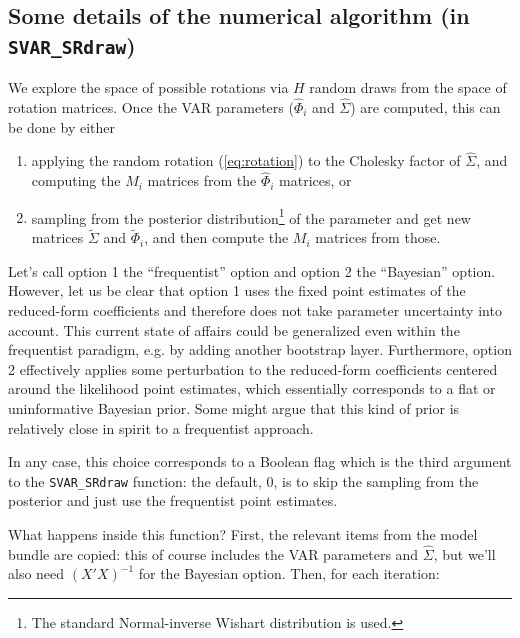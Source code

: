 \documentclass[a4paper,10pt]{article}
\begin{document}
\subsection{Some details of the numerical algorithm (in \texttt{SVAR\_SRdraw})}

We explore the space of possible
rotations via $H$ random draws from the space of rotation matrices.
Once the VAR parameters ($\hat{\Phi}_i$ and $\hat{\Sigma}$)
are computed, this can be done by either
\begin{enumerate}
\item applying the random rotation (\ref{eq:rotation}) to the Cholesky
  factor of $\hat{\Sigma}$, and computing the $M_i$ matrices from the
  $\hat{\Phi}_i$ matrices, or  
\item sampling from the posterior distribution\footnote{The standard
    Normal-inverse Wishart distribution is used.} of the parameter and
  get new matrices $\tilde{\Sigma}$ and $\tilde{\Phi}_i$, and then
  compute the $M_i$ matrices from those.
\end{enumerate}
Let's call option 1 the ``frequentist'' option and option 2 the
``Bayesian'' option. However, let us be clear that option 1 
uses the fixed point estimates of the reduced-form coefficients and 
therefore does not take parameter uncertainty into account. This current
state of affairs could be generalized even within the frequentist paradigm, 
e.g. by adding another bootstrap layer. Furthermore, option 2 effectively applies
some perturbation to the reduced-form coefficients centered around the 
likelihood point estimates, which essentially corresponds to a flat or 
uninformative Bayesian prior. Some might argue that this kind of prior is 
relatively close in spirit to a frequentist approach.

In any case, this choice corresponds to a Boolean flag which
is the third argument to the \texttt{SVAR\_SRdraw} function: the
default, 0, is to skip the sampling from the posterior and just use
the frequentist point estimates.

What happens inside this function? First, the relevant items from the
model bundle are copied: this of course includes the VAR parameters
and $\hat{\Sigma}$, but we'll also need $(X'X)^{-1}$ for the Bayesian
option.
Then, for each iteration:
\end{document}
